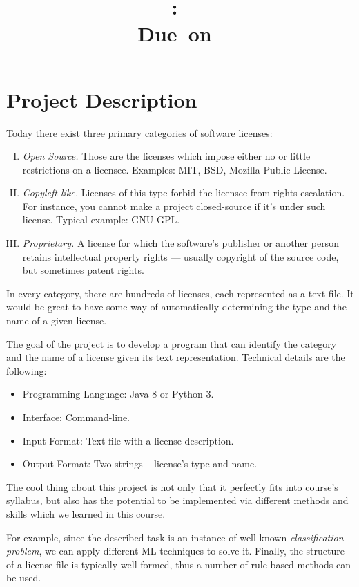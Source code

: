 \documentclass{article}
\title{
\vspace{2in}
\textmd{\textbf{\hmwkClass:\ \hmwkTitle}}\\
\normalsize\vspace{0.1in}\small{Due\ on\ \hmwkDueDate}\\
\vspace{0.1in}\large{\textit{\hmwkClassInstructor}}
\vspace{3in}
}
\author{\textbf{\hmwkAuthorName}}
\date{} %
\begin{document}
\maketitle
\newpage
\section{Project Description}
Today there exist three primary categories of software licenses:
\begin{enumerate}[I.]
    \item{\textit{Open Source.} Those are the licenses which impose either no or little restrictions on a licensee. Examples: MIT, BSD,
        Mozilla Public License.}
    \item{\textit{Copyleft-like.} Licenses of this type forbid the licensee from rights escalation. For instance, you cannot make
        a project closed-source if it's under such license. Typical example: GNU GPL.}
    \item{\textit{Proprietary.} A license for which the software's publisher or another person retains intellectual property rights —
        usually copyright of the source code, but sometimes patent rights.}
\end{enumerate}
In every category, there are hundreds of licenses, each represented as a text file. It would be great to have some way of
automatically determining the type and the name of a given license.

The goal of the project is to develop a program that can identify the category and the name of a license given its text
representation. Technical details are the following:
\begin{itemize}
    \item{Programming Language: Java 8 or Python 3.}
    \item{Interface: Command-line.}
    \item{Input Format: Text file with a license description.}
    \item{Output Format: Two strings -- license's type and name.}
\end{itemize}

The cool thing about this project is not only that it perfectly fits into course's syllabus, but also has the potential to be
implemented via different methods and skills which we learned in this course.

For example, since the described task is an instance of well-known \textit{classification problem}, we can apply different ML
techniques to solve it. Finally, the structure of a license file is typically well-formed, thus a number of rule-based methods can be
used.
\end{document}
